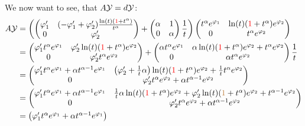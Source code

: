 We now want to see, that $A\mathcal{Y}=d\mathcal{Y}$:
\begin{align*}
  A\mathcal{Y}&=\left( \begin{pmatrix}
    \varphi_1' &
    (-\varphi_1'+\varphi_2')\frac{\ln(t)(\textcolor{red}{1}+t^\alpha)}{t^\alpha}
    \\0 & \varphi_2'
  \end{pmatrix} 
  +
  \begin{pmatrix} \alpha & 1 \\ 0 & \alpha \end{pmatrix} \frac{1}{t}
  \right)
  \begin{pmatrix}
    t^\alpha e^{\varphi_1} & \ln(t)(\textcolor{red}{1}+t^\alpha)e^{\varphi_2}
    \\0 & t^\alpha e^{\varphi_2}
  \end{pmatrix}
  \\&=\begin{pmatrix}
    \varphi_1' t^\alpha e^{\varphi_1}
    & \varphi_2'\ln(t)(\textcolor{red}{1}+t^\alpha) e^{\varphi_2}
    \\0 & \varphi_2' t^\alpha e^{\varphi_2}
  \end{pmatrix}
  +
  \begin{pmatrix}
    \alpha t^\alpha e^{\varphi_1} &
    \alpha\ln(t)(\textcolor{red}{1}+t^\alpha)e^{\varphi_2} + t^\alpha e^{\varphi_2}
    \\0 & \alpha t^\alpha e^{\varphi_2}
  \end{pmatrix}
  \frac{1}{t}
  \\&=\begin{pmatrix}
    \varphi_1' t^\alpha e^{\varphi_1} +\alpha t^{\alpha-1} e^{\varphi_1}
    &
    \left(\varphi_2'+\frac{1}{t}\alpha\right)
    \ln(t)(\textcolor{red}{1}+t^\alpha)e^{\varphi_2}
    +\frac{1}{t} t^\alpha e^{\varphi_2}
    \\0 & \varphi_2' t^\alpha e^{\varphi_2}+\alpha t^{\alpha-1} e^{\varphi_2}
  \end{pmatrix}
  \\&=\begin{pmatrix}
    \varphi_1' t^\alpha e^{\varphi_1} +\alpha t^{\alpha-1} e^{\varphi_1}
    &
    \frac{1}{t}\alpha\ln(t)(\textcolor{red}{1}+t^\alpha)e^{\varphi_2}
    +\varphi_2' \ln(t)(\textcolor{brown}{1}+t^\alpha)e^{\varphi_2}
    +t^{\alpha-1} e^{\varphi_2}
    \\0 & \varphi_2' t^\alpha e^{\varphi_2}+\alpha t^{\alpha-1} e^{\varphi_2}
  \end{pmatrix}
  \\&=\begin{pmatrix}
    \varphi_1' t^\alpha e^{\varphi_1} +\alpha t^{\alpha-1} e^{\varphi_1}

\end{pmatrix}
\end{align*}
